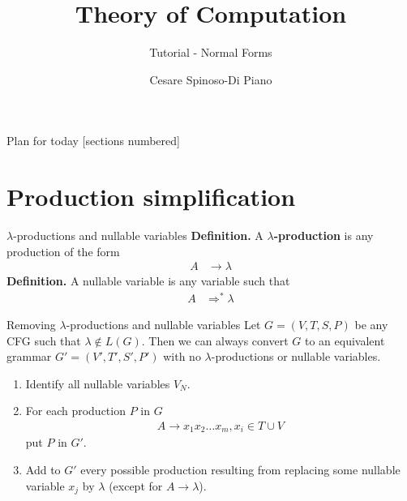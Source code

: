 \documentclass[10pt]{beamer}
\title{Theory of Computation}
\subtitle{Tutorial - Normal Forms}
\author{Cesare Spinoso-Di Piano}
\date{}
\begin{document}
\maketitle

\begin{frame}{Plan for today}
    [sections numbered]
    \tableofcontents[hideallsubsections]
\end{frame}

\section{Production simplification}

\begin{frame}{$\lambda$-productions and nullable variables}
    \textbf{Definition.} A \textbf{$\lambda$-production} is any production of the form
    \begin{align*}
        A & \rightarrow \lambda
    \end{align*}
    \textbf{Definition.} A nullable variable is any variable such that
    \begin{align*}
        A & \Rightarrow ^* \lambda
    \end{align*}

\end{frame}

\begin{frame}{Removing $\lambda$-productions and nullable variables}
    Let $G = (V,T,S,P)$ be any CFG such that $\lambda \notin L(G)$. Then we can always convert $G$ to an equivalent grammar $G' = (V',T',S',P')$ with no  $\lambda$-productions or nullable variables.
    \begin{enumerate}[1.]
        \item Identify all nullable variables $V_N$.
        \item For each production $P$ in $G$
              \begin{align*}
                  A \rightarrow x_1x_2\dots x_m, x_i \in T \cup V
              \end{align*}
              put $P$ in $G'$.
        \item Add to $G'$ every possible production resulting from replacing some nullable variable $x_j$ by $\lambda$ (except for $A \rightarrow \lambda$).
    \end{enumerate}
\end{frame}
\end{document}
